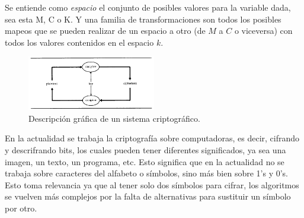 Se entiende como \textit{espacio} el conjunto de posibles valores para la variable dada, sea esta M, C o K.
Y una familia de transformaciones son todos los posibles mapeos que se pueden realizar de un espacio a otro (de $M$ a $C$ o viceversa) con todos los valores contenidos en el espacio $k$.

\begin{figure}[H]
	\centering
	\includegraphics[width=0.5\textwidth]{./images/figExplicacionSistemaCripto}
	\caption{Descripción gráfica de un sistema criptográfico.}
	\label{figExplicacionSistemaCripto}
\end{figure}
En la actualidad se trabaja la criptografía sobre computadoras, es decir, cifrando y descrifrando bits, los cuales pueden tener diferentes significados, ya sea una imagen, un texto, un programa, etc. Esto significa que en la actualidad no se trabaja sobre caracteres del alfabeto o símbolos, sino más bien sobre 1's y 0's. Esto toma relevancia ya que al tener solo dos símbolos para cifrar, los algoritmos se vuelven más complejos por la falta de alternativas para sustituir un símbolo por otro.
